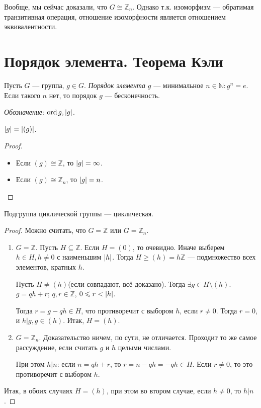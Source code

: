 \begin{remark*}
  Вообще, мы сейчас доказали, что $G \cong \mathbb{Z}_n$. Однако т.к. изоморфизм --- обратимая транзитивная операция, отношение изоморфности является отношением эквивалентности.
\end{remark*}

\section{Порядок элемента. Теорема Кэли}

\begin{define*}
  Пусть $G$ --- группа, $g \in G$. \emph{Порядок элемента} $g$ --- минимальное $n \in \mathbb{N}: g^n = e$. Если такого $n$ нет, то порядок $g$ --- бесконечность.

  \emph{Обозначение}: $\operatorname{ord} g, \left\lvert g \right\rvert$.
\end{define*}

\begin{claim}
  $\left\lvert g \right\rvert = \left\lvert (g) \right\rvert$.
  \begin{proof} $ $

	\begin{itemize}
	  \item 
		Если $(g) \cong \mathbb{Z}$, то $\left\lvert g \right\rvert = \infty$.
	  \item 
		Если $(g) \cong \mathbb{Z}_n$, то $\left\lvert g \right\rvert = n$.
	\end{itemize}
  \end{proof}
\end{claim}

\begin{Th}
  Подгруппа циклической группы --- циклическая.

  \begin{proof}
	Можно считать, что $G = \mathbb{Z}$ или $G = \mathbb{Z}_n$.
	\begin{enumerate}
	  \item $G = \mathbb{Z}$. Пусть $H \subseteq \mathbb{Z}$. Если $H = (0)$, то очевидно. Иначе
		выберем $h \in H, h \neq 0$ с наименьшим $\left\lvert h \right\rvert$. Тогда $H \ge (h) = h\mathbb{Z}$ --- подмножество всех элементов, кратных $h$.

		Пусть $H \neq (h)$(если совпадают, всё доказано). Тогда $\exists g \in H\setminus(h)$. $g = qh + r$; $q, r \in \mathbb{Z}$, $0 \leqslant r < \left\lvert h \right\rvert$.

		Тогда $r = g - qh \in H$, что противоречит с выбором $h$, если $r \neq 0$. Тогда $r = 0$, и $h | g, g \in (h)$. Итак, $H = (h)$.

	  \item $G = \mathbb{Z}_n$. Доказательство ничем, по сути, не отличается. Проходит то же самое рассуждение, если считать $g$ и $h$ целыми числами.

		При этом $h | n$: если $n = qh + r$, то $r = n - qh = -qh \in H$. Если $r \neq 0$, то это противоречит с выбором $h$.
	\end{enumerate}

	Итак, в обоих случаях $H = (h)$, при этом во втором случае, если $h \neq 0$, то $h | n$. 
  \end{proof}
\end{Th}


